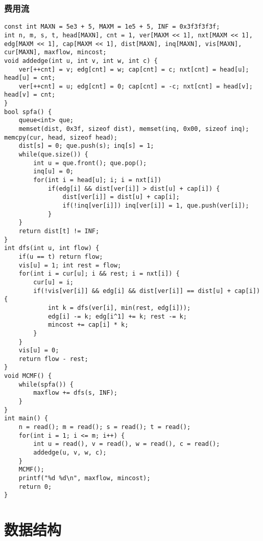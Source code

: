 \documentclass{article}
\begin{document}
\subsubsection{费用流}
\begin{lstlisting}
const int MAXN = 5e3 + 5, MAXM = 1e5 + 5, INF = 0x3f3f3f3f;
int n, m, s, t, head[MAXN], cnt = 1, ver[MAXM << 1], nxt[MAXM << 1], edg[MAXM << 1], cap[MAXM << 1], dist[MAXN], inq[MAXN], vis[MAXN], cur[MAXN], maxflow, mincost;
void addedge(int u, int v, int w, int c) {
	ver[++cnt] = v; edg[cnt] = w; cap[cnt] = c; nxt[cnt] = head[u]; head[u] = cnt;
	ver[++cnt] = u; edg[cnt] = 0; cap[cnt] = -c; nxt[cnt] = head[v]; head[v] = cnt;
}
bool spfa() {
	queue<int> que;
	memset(dist, 0x3f, sizeof dist), memset(inq, 0x00, sizeof inq); memcpy(cur, head, sizeof head);
	dist[s] = 0; que.push(s); inq[s] = 1;
	while(que.size()) {
		int u = que.front(); que.pop();
		inq[u] = 0;
		for(int i = head[u]; i; i = nxt[i])
			if(edg[i] && dist[ver[i]] > dist[u] + cap[i]) {
				dist[ver[i]] = dist[u] + cap[i];
				if(!inq[ver[i]]) inq[ver[i]] = 1, que.push(ver[i]);
			}
	}
	return dist[t] != INF;
}
int dfs(int u, int flow) {
	if(u == t) return flow;
	vis[u] = 1; int rest = flow;
	for(int i = cur[u]; i && rest; i = nxt[i]) {
		cur[u] = i;
		if(!vis[ver[i]] && edg[i] && dist[ver[i]] == dist[u] + cap[i]) {
			int k = dfs(ver[i], min(rest, edg[i]));
			edg[i] -= k; edg[i^1] += k; rest -= k;
			mincost += cap[i] * k;
		}
	}
	vis[u] = 0;
	return flow - rest;
}
void MCMF() {
	while(spfa()) {
		maxflow += dfs(s, INF);
	}
}
int main() {
	n = read(); m = read(); s = read(); t = read();
	for(int i = 1; i <= m; i++) {
		int u = read(), v = read(), w = read(), c = read();
		addedge(u, v, w, c);
	}
	MCMF();
	printf("%d %d\n", maxflow, mincost);
	return 0;
}
\end{lstlisting}
   \section{数据结构}
\end{document}
